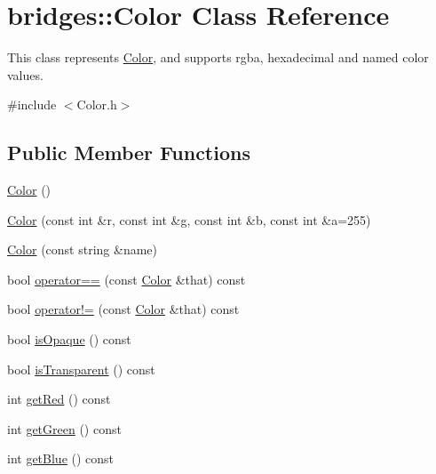 \hypertarget{classbridges_1_1_color}{}\section{bridges\+:\+:Color Class Reference}
\label{classbridges_1_1_color}


This class represents \mbox{\hyperlink{classbridges_1_1_color}{Color}}, and supports rgba, hexadecimal and named color values.  




{\ttfamily \#include $<$Color.\+h$>$}

\subsection*{Public Member Functions}
\begin{DoxyCompactItemize}
\item 
\mbox{\hyperlink{classbridges_1_1_color_ab89df8fea283d33585380ea91d78bbee}{Color}} ()
\item 
\mbox{\hyperlink{classbridges_1_1_color_aa861c0dc7729008cc4f886f235198181}{Color}} (const int \&r, const int \&g, const int \&b, const int \&a=255)
\item 
\mbox{\hyperlink{classbridges_1_1_color_a813c6cb59aad0883bcc12305fa6049cc}{Color}} (const string \&name)
\item 
bool \mbox{\hyperlink{classbridges_1_1_color_a9b33b4ee063496691f8816504cc8b007}{operator==}} (const \mbox{\hyperlink{classbridges_1_1_color}{Color}} \&that) const
\item 
bool \mbox{\hyperlink{classbridges_1_1_color_abe4ff1e5d4c6a33b2e9715be57ae0dce}{operator!=}} (const \mbox{\hyperlink{classbridges_1_1_color}{Color}} \&that) const
\item 
bool \mbox{\hyperlink{classbridges_1_1_color_ae55f3077cb3bd93386dc11eaeecf823c}{is\+Opaque}} () const
\item 
bool \mbox{\hyperlink{classbridges_1_1_color_a56b0d17239aafa0cea7f43e5358cf4c0}{is\+Transparent}} () const
\item 
int \mbox{\hyperlink{classbridges_1_1_color_a4c81e33854a6fdba9a3030e97ec8609e}{get\+Red}} () const
\item 
int \mbox{\hyperlink{classbridges_1_1_color_a93f8e016e1f1e6c177924ad8712e3e48}{get\+Green}} () const
\item 
int \mbox{\hyperlink{classbridges_1_1_color_aa7a70279f41f2cceb640162c43a2a382}{get\+Blue}} () const
\item 

\end{DoxyCompactItemize}
